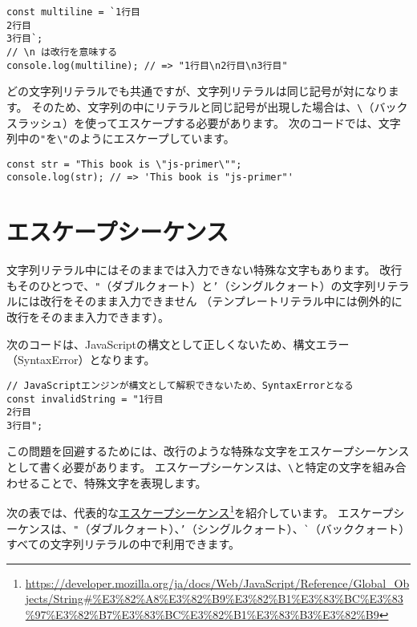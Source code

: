 \begin{lstlisting}
const multiline = `1行目
2行目
3行目`;
// \n は改行を意味する
console.log(multiline); // => "1行目\n2行目\n3行目"
\end{lstlisting}

どの文字列リテラルでも共通ですが、文字列リテラルは同じ記号が対になります。
そのため、文字列の中にリテラルと同じ記号が出現した場合は、\texttt{\textbackslash}\index{\\@\texttt{\textbackslash}}（バックスラッシュ）を使ってエスケープする必要があります。
次のコードでは、文字列中の\texttt{"}を\texttt{\textbackslash"}のようにエスケープしています。

\begin{lstlisting}
const str = "This book is \"js-primer\"";
console.log(str); // => 'This book is "js-primer"'
\end{lstlisting}

\hypertarget{escape-sequence}{%
\section{エスケープシーケンス}\label{escape-sequence}}

文字列リテラル中にはそのままでは入力できない特殊な文字もあります。
改行もそのひとつで、\texttt{"}（ダブルクォート）と\texttt{'}（シングルクォート）の文字列リテラルには改行をそのまま入力できません
（テンプレートリテラル中には例外的に改行をそのまま入力できます）。

次のコードは、JavaScriptの構文として正しくないため、構文エラー（SyntaxError）となります。

\begin{lstlisting}
// JavaScriptエンジンが構文として解釈できないため、SyntaxErrorとなる
const invalidString = "1行目
2行目
3行目";
\end{lstlisting}

この問題を回避するためには、改行のような特殊な文字をエスケープシーケンスとして書く必要があります。
エスケープシーケンスは、\texttt{\textbackslash}と特定の文字を組み合わせることで、特殊文字を表現します。

次の表では、代表的な\href{https://developer.mozilla.org/ja/docs/Web/JavaScript/Reference/Global_Objects/String\#\%E3\%82\%A8\%E3\%82\%B9\%E3\%82\%B1\%E3\%83\%BC\%E3\%83\%97\%E3\%82\%B7\%E3\%83\%BC\%E3\%82\%B1\%E3\%83\%B3\%E3\%82\%B9}{エスケープシーケンス}\footnote{\url{https://developer.mozilla.org/ja/docs/Web/JavaScript/Reference/Global_Objects/String\#\%E3\%82\%A8\%E3\%82\%B9\%E3\%82\%B1\%E3\%83\%BC\%E3\%83\%97\%E3\%82\%B7\%E3\%83\%BC\%E3\%82\%B1\%E3\%83\%B3\%E3\%82\%B9}}を紹介しています。
エスケープシーケンスは、\texttt{"}（ダブルクォート）、\texttt{'}（シングルクォート）、\lstinline{`}（バッククォート）すべての文字列リテラルの中で利用できます。

